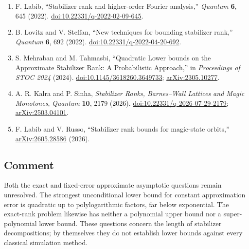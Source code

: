\begin{enumerate}[label={},leftmargin=4.8em,labelsep=0.5em]
  \item[\textup{[Lab22]}]\label{ref:srtk-lab22}
  F. Labib, ``Stabilizer rank and higher-order Fourier analysis,''
  \emph{Quantum} \textbf{6}, 645 (2022).
  \href{https://doi.org/10.22331/q-2022-02-09-645}{doi:10.22331/q-2022-02-09-645}.

  \item[\textup{[LS22]}]\label{ref:srtk-ls22}
  B. Lovitz and V. Steffan, ``New techniques for bounding stabilizer
  rank,'' \emph{Quantum} \textbf{6}, 692 (2022).
  \href{https://doi.org/10.22331/q-2022-04-20-692}{doi:10.22331/q-2022-04-20-692}.

  \item[\textup{[MT24]}]\label{ref:srtk-mt24}
  S. Mehraban and M. Tahmasbi, ``Quadratic Lower bounds on the Approximate
  Stabilizer Rank: A Probabilistic Approach,'' in \emph{Proceedings of
  STOC 2024} (2024).
  \href{https://doi.org/10.1145/3618260.3649733}{doi:10.1145/3618260.3649733};
  \href{https://arxiv.org/abs/2305.10277}{arXiv:2305.10277}.

  \item[\textup{[KS26]}]\label{ref:srtk-ks25}
  A. R. Kalra and P. Sinha, \emph{Stabilizer Ranks, Barnes--Wall Lattices and Magic Monotones}, \emph{Quantum} \textbf{10}, 2179 (2026). \href{https://doi.org/10.22331/q-2026-07-29-2179}{doi:10.22331/q-2026-07-29-2179}; \href{https://arxiv.org/abs/2503.04101}{arXiv:2503.04101}.

  \item[\textup{[LR26]}]\label{ref:srtk-lr26}
  F. Labib and V. Russo, ``Stabilizer rank bounds for magic-state
  orbits,'' \href{https://arxiv.org/abs/2605.28586}{arXiv:2605.28586}
  (2026).
\end{enumerate}

\subsection*{Comment}

Both the exact and fixed-error approximate asymptotic questions remain unresolved. The strongest unconditional lower bound for constant approximation error is quadratic up to polylogarithmic factors, far below exponential. The exact-rank problem likewise has neither a polynomial upper bound nor a super-polynomial lower bound. These questions concern the length of stabilizer decompositions; by themselves they do not establish lower bounds against every classical simulation method.

